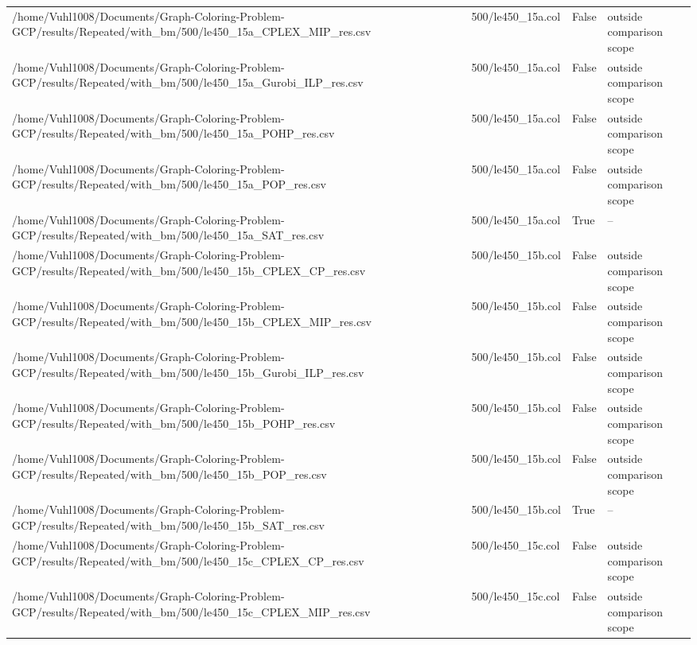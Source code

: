\begin{table}[htbp]
\begin{tabular}{llll}
/home/Vuhl1008/Documents/Graph-Coloring-Problem-GCP/results/Repeated/with\_bm/500/le450\_15a\_CPLEX\_MIP\_res.csv & 500/le450\_15a.col & False & outside comparison scope \\
/home/Vuhl1008/Documents/Graph-Coloring-Problem-GCP/results/Repeated/with\_bm/500/le450\_15a\_Gurobi\_ILP\_res.csv & 500/le450\_15a.col & False & outside comparison scope \\
/home/Vuhl1008/Documents/Graph-Coloring-Problem-GCP/results/Repeated/with\_bm/500/le450\_15a\_POHP\_res.csv & 500/le450\_15a.col & False & outside comparison scope \\
/home/Vuhl1008/Documents/Graph-Coloring-Problem-GCP/results/Repeated/with\_bm/500/le450\_15a\_POP\_res.csv & 500/le450\_15a.col & False & outside comparison scope \\
/home/Vuhl1008/Documents/Graph-Coloring-Problem-GCP/results/Repeated/with\_bm/500/le450\_15a\_SAT\_res.csv & 500/le450\_15a.col & True & -- \\
/home/Vuhl1008/Documents/Graph-Coloring-Problem-GCP/results/Repeated/with\_bm/500/le450\_15b\_CPLEX\_CP\_res.csv & 500/le450\_15b.col & False & outside comparison scope \\
/home/Vuhl1008/Documents/Graph-Coloring-Problem-GCP/results/Repeated/with\_bm/500/le450\_15b\_CPLEX\_MIP\_res.csv & 500/le450\_15b.col & False & outside comparison scope \\
/home/Vuhl1008/Documents/Graph-Coloring-Problem-GCP/results/Repeated/with\_bm/500/le450\_15b\_Gurobi\_ILP\_res.csv & 500/le450\_15b.col & False & outside comparison scope \\
/home/Vuhl1008/Documents/Graph-Coloring-Problem-GCP/results/Repeated/with\_bm/500/le450\_15b\_POHP\_res.csv & 500/le450\_15b.col & False & outside comparison scope \\
/home/Vuhl1008/Documents/Graph-Coloring-Problem-GCP/results/Repeated/with\_bm/500/le450\_15b\_POP\_res.csv & 500/le450\_15b.col & False & outside comparison scope \\
/home/Vuhl1008/Documents/Graph-Coloring-Problem-GCP/results/Repeated/with\_bm/500/le450\_15b\_SAT\_res.csv & 500/le450\_15b.col & True & -- \\
/home/Vuhl1008/Documents/Graph-Coloring-Problem-GCP/results/Repeated/with\_bm/500/le450\_15c\_CPLEX\_CP\_res.csv & 500/le450\_15c.col & False & outside comparison scope \\
/home/Vuhl1008/Documents/Graph-Coloring-Problem-GCP/results/Repeated/with\_bm/500/le450\_15c\_CPLEX\_MIP\_res.csv & 500/le450\_15c.col & False & outside comparison scope \\

\end{tabular}
\end{table}
